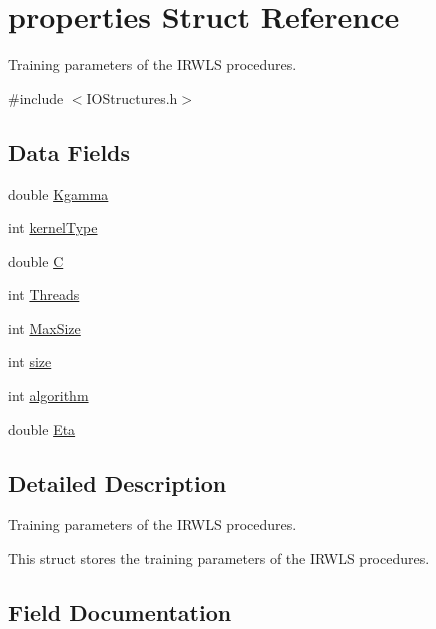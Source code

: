 \hypertarget{structproperties}{}\section{properties Struct Reference}
\label{structproperties}


Training parameters of the I\+R\+W\+LS procedures.  




{\ttfamily \#include $<$I\+O\+Structures.\+h$>$}

\subsection*{Data Fields}
\begin{DoxyCompactItemize}
\item 
double \hyperlink{structproperties_aab9c0195a446f08fc782701750ddb6ac}{Kgamma}
\item 
int \hyperlink{structproperties_a2cb295bd30c81b5bec52b79e67106881}{kernel\+Type}
\item 
double \hyperlink{structproperties_a3b98814395b295db30f029e5e67ae9c9}{C}
\item 
int \hyperlink{structproperties_a56ab77c44fb808e71990074bd75529ed}{Threads}
\item 
int \hyperlink{structproperties_a42219768dd35e1ab628e1785759df400}{Max\+Size}
\item 
int \hyperlink{structproperties_a1694aebbbdd904f9b0e5faca725966b6}{size}
\item 
int \hyperlink{structproperties_aa0ba665a115d2e69811c694bc1af5096}{algorithm}
\item 
double \hyperlink{structproperties_abd91deb543a31a6a1f75892af7cf95c8}{Eta}
\end{DoxyCompactItemize}


\subsection{Detailed Description}
Training parameters of the I\+R\+W\+LS procedures. 

This struct stores the training parameters of the I\+R\+W\+LS procedures. 

\subsection{Field Documentation}
\hypertarget{structproperties_aa0ba665a115d2e69811c694bc1af5096}{}\label{structproperties_aa0ba665a115d2e69811c694bc1af5096} 
